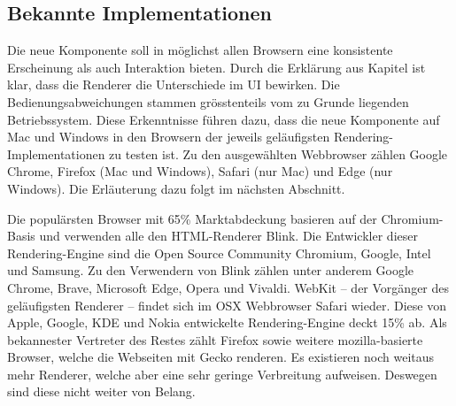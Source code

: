 \subsection{Bekannte Implementationen}
\label{sec:implementationsRenderer}

Die neue Komponente soll in möglichst allen Browsern eine konsistente Erscheinung als auch Interaktion bieten.
Durch die Erklärung aus Kapitel \textbf{} ist klar, dass die Renderer die Unterschiede im UI bewirken.
Die Bedienungsabweichungen stammen grösstenteils vom zu Grunde liegenden Betriebssystem.
Diese Erkenntnisse führen dazu, dass die neue Komponente auf Mac und Windows in den Browsern der jeweils geläufigsten Rendering-Implementationen zu testen ist.
Zu den ausgewählten Webbrowser zählen Google Chrome, Firefox (Mac und Windows), Safari (nur Mac) und Edge (nur Windows).
Die Erläuterung dazu folgt im nächsten Abschnitt.

Die populärsten Browser mit 65\% Marktabdeckung basieren auf der Chromium-Basis und verwenden alle den HTML-Renderer Blink.
Die Entwickler dieser Rendering-Engine sind die Open Source Community Chromium, Google, Intel und Samsung.
Zu den Verwendern von Blink zählen unter anderem Google Chrome, Brave, Microsoft Edge, Opera und Vivaldi.
WebKit – der Vorgänger des geläufigsten Renderer – findet sich im OSX Webbrowser Safari wieder.
Diese von Apple, Google, KDE und Nokia entwickelte Rendering-Engine deckt 15\% ab.
Als bekannester Vertreter des Restes zählt Firefox sowie weitere mozilla-basierte Browser, welche die Webseiten mit Gecko renderen.
Es existieren noch weitaus mehr Renderer, welche aber eine sehr geringe Verbreitung aufweisen.
Deswegen sind diese nicht weiter von Belang.
